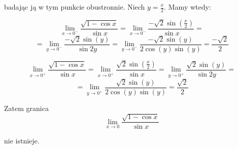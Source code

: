 \documentclass{article}
\begin{document}
badając ją w tym punkcie obustronnie. Niech \(y = \frac{x}{2}\). Mamy wtedy:

\begin{equation*}
    \lim_{x \to 0^{-}} \frac{\sqrt{1 - \cos x}}{\sin x} = \lim_{x \to 0^{-}} \frac{- \sqrt{2}  \sin (\frac{x}{2})}{\sin x} = 
\end{equation*}
\begin{equation*}
    = \lim_{y \to 0^{-}} \frac{-\sqrt{2} \sin (y)}{\sin 2y} = \lim_{y \to 0^{-}} \frac{- \sqrt{2} \sin (y)}{2 \cos(y) \sin(y)} = \frac{- \sqrt{2}}{2}
\end{equation*}

\begin{equation*}
    \lim_{x \to 0^{+}} \frac{\sqrt{1 - \cos x}}{\sin x} = \lim_{x \to 0^{+}} \frac{ \sqrt{2}  \sin (\frac{x}{2})}{\sin x} = \lim_{y \to 0^{+}} \frac{\sqrt{2} \sin (y)}{\sin 2y} =
\end{equation*}
\begin{equation*}
    = \lim_{y \to 0^{+}} \frac{\sqrt{2} \sin (y)}{2 \cos(y) \sin(y)} = \frac{\sqrt{2}}{2}
\end{equation*}

Zatem granica
\begin{equation*}
    \lim_{x \to 0} \frac{\sqrt{1 - \cos x}}{\sin x}
\end{equation*}

nie istnieje.
\end{document}
